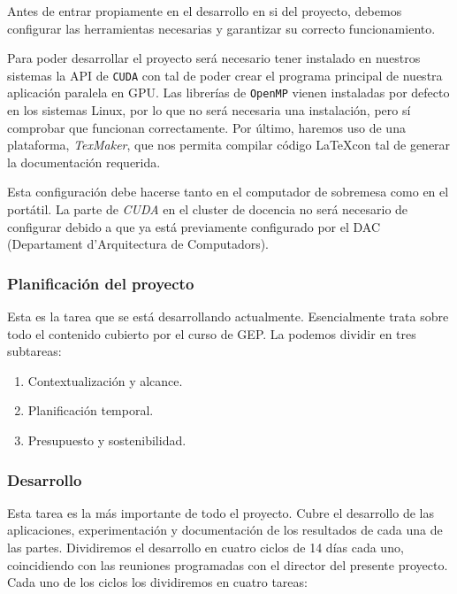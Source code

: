 \documentclass[titlepage,12pt]{report}
\begin{document}
Antes de entrar propiamente en el desarrollo en si del proyecto, debemos configurar las herramientas necesarias y garantizar su correcto funcionamiento.

Para poder desarrollar el proyecto será necesario tener instalado en nuestros sistemas la API de \texttt{CUDA} con tal de poder crear el programa principal de nuestra aplicación paralela en GPU. Las librerías de \texttt{OpenMP} vienen instaladas por defecto en los sistemas Linux, por lo que no será necesaria una instalación, pero sí comprobar que funcionan correctamente. Por último, haremos uso de una plataforma, \textit{TexMaker}, que nos permita compilar código \LaTeX  con tal de generar la documentación requerida.

Esta configuración debe hacerse tanto en el computador de sobremesa como en el portátil. La parte de \textit{CUDA} en el cluster de docencia no será necesario de configurar debido a que ya está previamente configurado por el DAC (Departament d'Arquitectura de Computadors). 

\subsubsection{Planificación del proyecto}

Esta es la tarea que se está desarrollando actualmente. Esencialmente trata sobre todo el contenido cubierto por el curso de GEP. La podemos dividir en tres subtareas:

\begin{enumerate}
		\item Contextualización y alcance.
		\item Planificación temporal.
		\item Presupuesto y sostenibilidad.
\end{enumerate}

\subsubsection{Desarrollo}

Esta tarea es la más importante de todo el proyecto. Cubre el desarrollo de las aplicaciones, experimentación y documentación de los resultados de cada una de las partes. Dividiremos el desarrollo en cuatro ciclos de 14 días cada uno, coincidiendo con las reuniones programadas con el director del presente proyecto. Cada uno de los ciclos los dividiremos en cuatro tareas:
\end{document}
